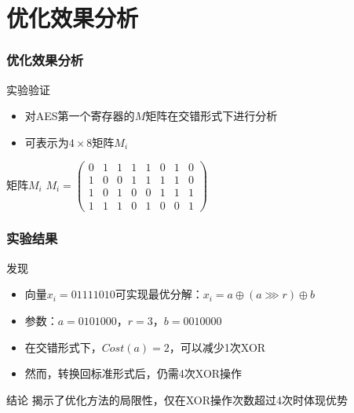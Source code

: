 \documentclass{beamer}
\begin{document}
\section{优化效果分析}
\begin{frame}
    \frametitle{优化效果分析}
    \begin{block}{实验验证}
        \begin{itemize}
            \item 对AES第一个寄存器的$M$矩阵在交错形式下进行分析
            \item 可表示为$4\times8$矩阵$M_i$
        \end{itemize}
    \end{block}
    \begin{exampleblock}{矩阵$M_i$}
        \small{
        $M_i = \begin{pmatrix}
            0 & 1 & 1 & 1 & 1 & 0 & 1 & 0 \\
            1 & 0 & 0 & 1 & 1 & 1 & 1 & 0 \\
            1 & 0 & 1 & 0 & 0 & 1 & 1 & 1 \\
            1 & 1 & 1 & 0 & 1 & 0 & 0 & 1
        \end{pmatrix}$
        }
    \end{exampleblock}
\end{frame}

\begin{frame}
    \frametitle{实验结果}
    \begin{block}{发现}
        \begin{itemize}
            \item 向量$x_i = 01111010$可实现最优分解：$x_i = a \oplus (a \ggg r) \oplus b$
            \item 参数：$a = 0101000$，$r = 3$，$b = 0010000$
            \item 在交错形式下，$Cost(a) = 2$，可以减少1次XOR
            \item 然而，转换回标准形式后，仍需4次XOR操作
        \end{itemize}
    \end{block}
    \begin{block}{结论}
        揭示了\cite{Leurent2024}优化方法的局限性，仅在XOR操作次数超过4次时体现优势
    \end{block}
\end{frame}
\end{document}
